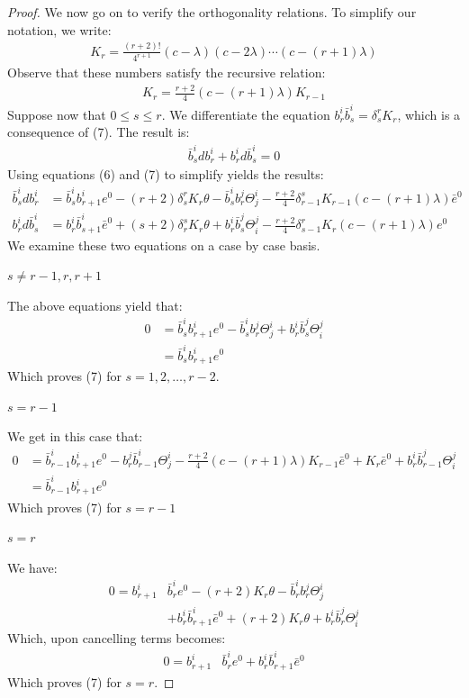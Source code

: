 \begin{proof}
We now go on to verify the orthogonality relations.  To simplify our notation, we write:
%
\begin{align*}
K_r = \frac{(r + 2)!}{4^{r + 1}} (c - \lambda)(c - 2 \lambda) \cdots (c - (r+1) \lambda)
\end{align*}
%
Observe that these numbers satisfy the recursive relation:
%
\begin{align*}
K_{r} = \frac{r+2}{4} (c - (r+1) \lambda ) K_{r-1}
\end{align*}
%
Suppose now that $0 \leq s \leq r$.  We differentiate the equation $b^i_r \bar{b}^i_s = \delta^r_s K_r$, which is a consequence of (7).  The result is:
%
\begin{align*}
\bar{b}^i_s d b^i_r + b^i_r d \bar{b}^i_s = 0
\end{align*}
%
Using equations (6) and (7) to simplify yields the results:
%
\begin{align*}
\bar{b}^i_s d b^i_r &= \bar{b}^i_s b^i_{r+1} e^0 - (r+2) \delta^r_s K_r \theta - \bar{b}^i_s b^j_r \Theta^i_j - \frac{r+2}{4} \delta^s_{r-1} K_{r-1} (c - (r+1) \lambda ) \bar{e}^0 \\
b^i_r d \bar{b}^i_s &= b^i_r \bar{b}^i_{s+1} \bar{e}^0 + (s + 2) \delta^s_r K_r \theta + b^i_r \bar{b}^j_s \Theta^j_i - \frac{r+2}{4} \delta^r_{s-1} K_r (c-(r+1) \lambda) e^0
\end{align*} 
%
We examine these two equations on a case by case basis.

\begin{case} $s \neq r-1,r,r+1$
\end{case}
%
The above equations yield that:
%
\begin{align*}
0 &= \bar{b}^i_s b^i_{r+1} e^0 - \bar{b}^i_s b^j_r \Theta^i_j + b^i_r \bar{b}^j_s \Theta^j_i \\
&= \bar{b}^i_s b^i_{r+1} e^0
\end{align*}
%
Which proves (7) for $s = 1,2,\ldots, r-2$.

\begin{case} $s = r-1$
\end{case}
%
We get in this case that:
%
\begin{align*}
0 &= \bar{b}^i_{r-1} b^i_{r+1} e^0 - b^j_r \bar{b}^i_{r-1} \Theta^i_j - \frac{r+2}{4} (c - (r+1) \lambda ) K_{r-1} \bar{e}^0 + K_r \bar{e}^0 + b^i_r \bar{b}^j_{r-1} \Theta^j_i \\
&= \bar{b}^i_{r-1} b^i_{r+1} e^0
\end{align*}
%
Which proves (7) for $s = r - 1$

\begin{case} $s = r$
\end{case}
%
We have:
%
\begin{align*}
0 = b^i_{r+1} & \bar{b}^i_r e^0 - (r+2) K_r \theta - \bar{b}^i_r b^j_r \Theta^i_j \\
&+ b^i_r \bar{b}^i_{r+1} \bar{e}^0 + (r+2) K_r \theta + b^i_r \bar{b}^j_r \Theta^j_i 
\end{align*}
%
Which, upon cancelling terms becomes:
%
\begin{align*}
0 = b^i_{r+1} & \bar{b}^i_r e^0 +  b^i_r \bar{b}^i_{r+1} \bar{e}^0
\end{align*}
%
Which proves (7) for $s = r$.


\end{proof}
